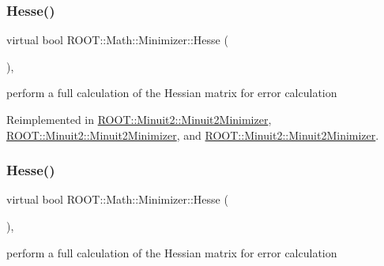 \mbox{\label{classROOT_1_1Math_1_1Minimizer_ae903e5936bef4ea7fac3301f9cdc50be}} 
\subsubsection{\texorpdfstring{Hesse()}{Hesse()}\hspace{0.1cm}{\footnotesize\ttfamily [1/3]}}
{\footnotesize\ttfamily virtual bool R\+O\+O\+T\+::\+Math\+::\+Minimizer\+::\+Hesse (\begin{DoxyParamCaption}{ }\end{DoxyParamCaption})\hspace{0.3cm}{\ttfamily [inline]}, {\ttfamily [virtual]}}

perform a full calculation of the Hessian matrix for error calculation 

Reimplemented in \mbox{\hyperlink{classROOT_1_1Minuit2_1_1Minuit2Minimizer_a0cfd04fde73c157de423705625ede51c}{R\+O\+O\+T\+::\+Minuit2\+::\+Minuit2\+Minimizer}}, \mbox{\hyperlink{classROOT_1_1Minuit2_1_1Minuit2Minimizer_a0cfd04fde73c157de423705625ede51c}{R\+O\+O\+T\+::\+Minuit2\+::\+Minuit2\+Minimizer}}, and \mbox{\hyperlink{classROOT_1_1Minuit2_1_1Minuit2Minimizer_a0cfd04fde73c157de423705625ede51c}{R\+O\+O\+T\+::\+Minuit2\+::\+Minuit2\+Minimizer}}.

\mbox{\label{classROOT_1_1Math_1_1Minimizer_ae903e5936bef4ea7fac3301f9cdc50be}} 
\subsubsection{\texorpdfstring{Hesse()}{Hesse()}\hspace{0.1cm}{\footnotesize\ttfamily [2/3]}}
{\footnotesize\ttfamily virtual bool R\+O\+O\+T\+::\+Math\+::\+Minimizer\+::\+Hesse (\begin{DoxyParamCaption}{ }\end{DoxyParamCaption})\hspace{0.3cm}{\ttfamily [inline]}, {\ttfamily [virtual]}}

perform a full calculation of the Hessian matrix for error calculation 

